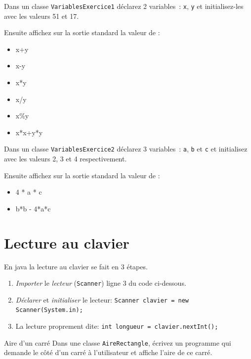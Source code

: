 \documentclass[a4paper,11pt]{article}
\begin{document}
	\begin{Exercice}{} 		
		Dans un classe \texttt{VariablesExercice1} déclarez 2 variables~: 
		\texttt{x}, \texttt{y} et initialisez-les avec les valeurs 51 et 17.
		
		Ensuite affichez sur la sortie standard la valeur de :
		\begin{itemize}
		 	\item x+y
			\item x-y
			\item x*y
			\item x/y
			\item x\%y
			\item x*x+y*y
		\end{itemize} 
	\end{Exercice}

	\begin{Exercice}{} 
		Dans un classe \texttt{VariablesExercice2} déclarez 3 variables~: 
		\texttt{a}, \texttt{b} et \texttt{c} et initialisez avec les valeurs 2, 3 et 4 respectivement.
		
		Ensuite affichez sur la sortie standard la valeur de :
		\begin{itemize}
		 	\item 4 * a * c
			\item b*b - 4*a*c
		\end{itemize} 
	\end{Exercice}

\section{Lecture au clavier}


	En java la lecture au clavier se fait en 3 étapes.

	\begin{enumerate}
		\item \emph{Importer} le \emph{lecteur} (\texttt{Scanner}) ligne 3 du code ci-dessous.
		\item \emph{Déclarer} et \emph{initialiser} le lecteur:  \texttt{Scanner clavier = new Scanner(System.in);}
		\item La lecture proprement dite: \texttt{int longueur = clavier.nextInt();}
	\end{enumerate}




	\begin{Exercice}{Aire d'un carré}
		Dans une classe \texttt{AireRectangle}, écrivez un programme qui demande 
		le côté d'un carré à l'utilisateur et affiche l'aire de ce carré.
	\end{Exercice}
\end{document}
